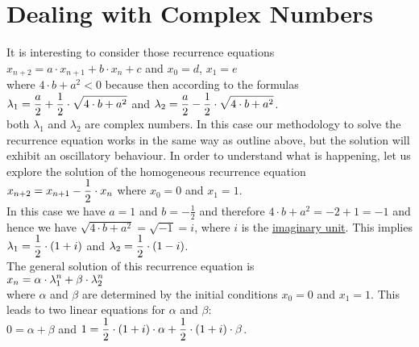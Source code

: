 \section{Dealing with Complex Numbers}
It is interesting to consider those recurrence equations 
\\[0.2cm]
\hspace*{1.3cm}
$x_{n+2} = a \cdot x_{n+1} + b \cdot x_n + c$ \quad and \quad $x_0 = d$, $x_1 = e$
\\[0.2cm]
where $4 \cdot b + a^2 < 0$ because then according to the formulas
\\[0.2cm]
\hspace*{1.3cm}
$\displaystyle\lambda_1 = \frac{a}{2} + \frac{1}{2} \cdot \sqrt{4 \cdot b + a^2}$ \quad and \quad
$\displaystyle\lambda_2 = \frac{a}{2} - \frac{1}{2} \cdot \sqrt{4 \cdot b + a^2}$.
\\[0.2cm]
both $\lambda_1$ and $\lambda_2$ are complex numbers.  In this case our methodology to solve the
recurrence equation works in the same way as outline above, but the solution will exhibit an oscillatory
behaviour.  In order to understand what is happening, let us explore the solution of the homogeneous recurrence
equation 
\\[0.2cm]
\hspace*{1.3cm}
$\displaystyle x_{n+2} = x_{n+1} - \frac{1}{2} \cdot x_n$ \quad where $x_0 = 0$ and $x_1 = 1$.
\\[0.2cm]
In this case we have $a = 1$ and $b = -\frac{1}{2}$ and therefore $4 \cdot b + a^2 = -2 + 1 = -1$ and hence we
have $\sqrt{4 \cdot b + a^2} = \sqrt{-1} = i$, where $i$ is the
\href{https://en.wikipedia.org/wiki/Imaginary_unit}{imaginary unit}.  
This implies
\\[0.2cm]
\hspace*{1.3cm}
$\displaystyle\lambda_1 = \frac{1}{2} \cdot (1 + i)$ \quad and \quad $\displaystyle\lambda_2 = \frac{1}{2} \cdot (1 - i)$.
\\[0.2cm]
The general solution of this recurrence equation is
\\[0.2cm]
\hspace*{1.3cm}
$\displaystyle x_n = \alpha \cdot \lambda_1^n + \beta \cdot \lambda_2^n$
\\[0.2cm]
where $\alpha$ and $\beta$ are determined by the initial conditions $x_0 = 0$ and $x_1 = 1$.
This leads to two linear equations for $\alpha$ and $\beta$:
\\[0.2cm]
\hspace*{1.3cm}
$0 = \alpha + \beta$ \quad and \quad
$\displaystyle 1 = \frac{1}{2} \cdot (1 + i) \cdot \alpha + \frac{1}{2} \cdot (1 + i) \cdot \beta$.
